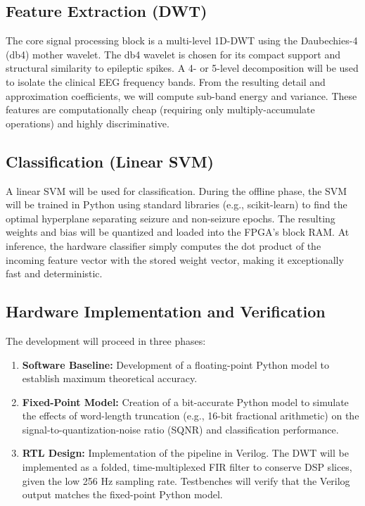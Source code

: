 \documentclass[10pt,twocolumn,letterpaper]{article}
\begin{document}
\subsection{Feature Extraction (DWT)}
The core signal processing block is a multi-level 1D-DWT using the Daubechies-4 (db4) mother wavelet. The db4 wavelet is chosen for its compact support and structural similarity to epileptic spikes. A 4- or 5-level decomposition will be used to isolate the clinical EEG frequency bands. From the resulting detail and approximation coefficients, we will compute sub-band energy and variance. These features are computationally cheap (requiring only multiply-accumulate operations) and highly discriminative.

\subsection{Classification (Linear SVM)}
A linear SVM will be used for classification. During the offline phase, the SVM will be trained in Python using standard libraries (e.g., scikit-learn) to find the optimal hyperplane separating seizure and non-seizure epochs. The resulting weights and bias will be quantized and loaded into the FPGA's block RAM. At inference, the hardware classifier simply computes the dot product of the incoming feature vector with the stored weight vector, making it exceptionally fast and deterministic.

\subsection{Hardware Implementation and Verification}
The development will proceed in three phases:
\begin{enumerate}
    \item \textbf{Software Baseline:} Development of a floating-point Python model to establish maximum theoretical accuracy.
    \item \textbf{Fixed-Point Model:} Creation of a bit-accurate Python model to simulate the effects of word-length truncation (e.g., 16-bit fractional arithmetic) on the signal-to-quantization-noise ratio (SQNR) and classification performance.
    \item \textbf{RTL Design:} Implementation of the pipeline in Verilog. The DWT will be implemented as a folded, time-multiplexed FIR filter to conserve DSP slices, given the low 256 Hz sampling rate. Testbenches will verify that the Verilog output matches the fixed-point Python model.
\end{enumerate}
\end{document}
